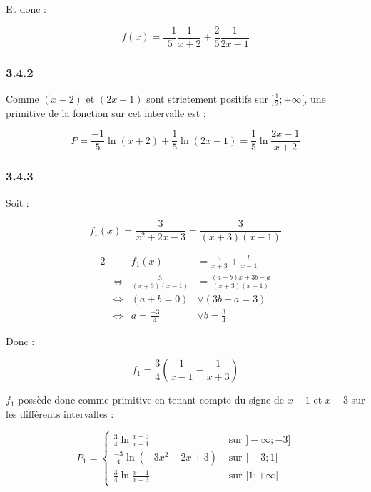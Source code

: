 \documentclass[a4paper,10pt]{report}
\begin{document}
Et donc :

\begin{displaymath}
	f(x) = \frac{-1}{5}\frac{1}{x+2} +  \frac{2}{5}\frac{1}{2x-1}
\end{displaymath}

\subsubsection*{3.4.2}

Comme $(x+2)$ et $(2x-1)$ sont strictement positifs sur $]\frac{1}{2};+\infty[$, une primitive de la fonction sur cet
intervalle est :

\begin{displaymath}
	P = \frac{-1}{5}\ln(x+2)+  \frac{1}{5}\ln(2x-1) = \frac{1}{5}\ln \frac{2x-1}{x+2}
\end{displaymath}

\subsubsection*{3.4.3}

Soit :

\begin{equation*}
	f_1(x) =\frac{3}{x^2 + 2x -3} = \frac{3}{(x+3)(x-1)}
\end{equation*}

\begin{alignat*}{2}
	&                     &                f_1(x) &= \frac{a}{x+3} +  \frac{b}{x-1}\\
	& \Longleftrightarrow & \frac{3}{(x+3)(x-1)}  &=  \frac{(a+b)x + 3b -a}{(x+3)(x-1)} \\
	& \Longleftrightarrow & (a+b=0)               &\vee (3b-a = 3) \\
	& \Longleftrightarrow & a=\frac{-3}{4}        &\vee b = \frac{3}{4}
\end{alignat*}

Donc :

\begin{displaymath}
	f_1 = \frac{3}{4} \left( \frac{1}{x-1} - \frac{1}{x+3} \right)
\end{displaymath}

$f_1$ possède donc comme primitive en tenant compte du signe de $x-1$ et $x+3$ sur les différents intervalles :

\begin{displaymath}
	P_1 = 
	\begin{cases}
		\frac{3}{4} \ln \frac{x+3}{x-1}      & \text{ sur } ]-\infty ; -3]\\
		\frac{-3}{4} \ln(-3x^2-2x+3)         & \text{ sur } ]-3 ; 1[\\
		\frac{3}{4} \ln \frac{x-1}{x+3}      & \text{ sur } ]1 ; +\infty[
	\end{cases}
\end{displaymath}
\end{document}
